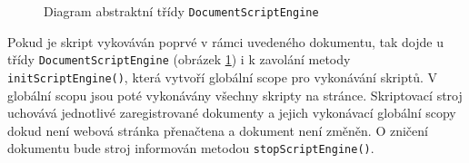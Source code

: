 \begin{figure}[H]
  \begin{center}
    \caption{Diagram abstraktní třídy \texttt{DocumentScriptEngine}}
    \label{Figure.DocumentScriptEngineDesign}
  \end{center}
\end{figure}

Pokud je skript vykováván poprvé v rámci uvedeného dokumentu, tak dojde u třídy \texttt{DocumentScriptEngine} (obrázek \ref{Figure.DocumentScriptEngineDesign}) i k zavolání metody \texttt{initScriptEngine()}, která vytvoří globální scope pro vykonávání skriptů. V globální scopu jsou poté vykonávány všechny skripty na stránce. Skriptovací stroj uchovává jednotlivé zaregistrované dokumenty a jejich vykonávací globální scopy dokud není webová stránka přenačtena a dokument není změněn. O zničení dokumentu bude stroj informován metodou \texttt{stopScriptEngine()}.

